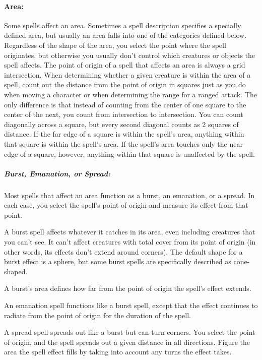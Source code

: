 \paragraph{Area:} Some spells affect an area. Sometimes a spell description specifies a specially defined area, but usually an area falls into one of the categories defined below.
Regardless of the shape of the area, you select the point where the spell originates, but otherwise you usually don't control which creatures or objects the spell affects. 
The point of origin of a spell that affects an area is always a grid intersection. 
When determining whether a given creature is within the area of a spell, count out the distance from the point of origin in squares just as you do when moving a character or when determining the range for a ranged attack. 
The only difference is that instead of counting from the center of one square to the center of the next, you count from intersection to intersection.
You can count diagonally across a square, but every second diagonal counts as 2 squares of distance. 
If the far edge of a square is within the spell's area, anything within that square is within the spell's area. 
If the spell's area touches only the near edge of a square, however, anything within that square is unaffected by the spell.

\subparagraph{Burst, Emanation, or Spread:} \label{sec:AreaShapes} Most spells that affect an area function as a burst, an emanation, or a spread. 
In each case, you select the spell's point of origin and measure its effect from that point. 

A burst spell affects whatever it catches in its area, even including creatures that you can't see. 
It can't affect creatures with total cover from its point of origin (in other words, its effects don't extend around corners). 
The default shape for a burst effect is a sphere, but some burst spells are specifically described as cone-shaped.

A burst's area defines how far from the point of origin the spell's effect extends.

An emanation spell functions like a burst spell, except that the effect continues to radiate from the point of origin for the duration of the spell.

A spread spell spreads out like a burst but can turn corners. You select the point of origin, and the spell spreads out a given distance in all directions. 
Figure the area the spell effect fills by taking into account any turns the effect takes.

